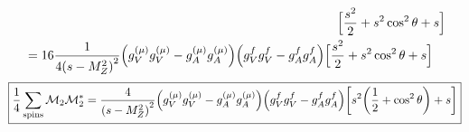 \documentclass[12 pt,draft]{article}
\renewcommand{\b}[1]{\overline{#1}}
\begin{document}
\begin{problem}[ $\mu\b{\mu}\rightarrow f\b{f}$]
\begin{align}
\begin{split}
				\Big[
					\oo[s^2]{2}+s^2\cos^2\theta+s
				\Big]
			\end{split}
			\\
			\begin{split}
				&=16\oo{4\qty(s-M_Z^2)^2}
				\qty(g_V^{(\mu)}g_V^{(\mu)}-g_A^{(\mu)}g_A^{(\mu)})
				\qty(g_V^fg_V^f-g_A^fg_A^f)
				\Big[
					\oo[s^2]{2}+s^2\cos^2\theta+s
				\Big]
			\end{split}
		\end{align}
		\begin{align}
			\begin{split}
				\boxed{\oo{4}\sum_\text{spins}\mathcal{M}_2\mathcal{M}_2^*
				=\oo[4]{\qty(s-M_Z^2)^2}
				\qty(g_V^{(\mu)}g_V^{(\mu)}-g_A^{(\mu)}g_A^{(\mu)})
				\qty(g_V^fg_V^f-g_A^fg_A^f)
				\qty[s^2\qty(\oo{2}+\cos^2\theta)+s]}
			\end{split}
		\end{align}

	\end{problem}
\end{document}
